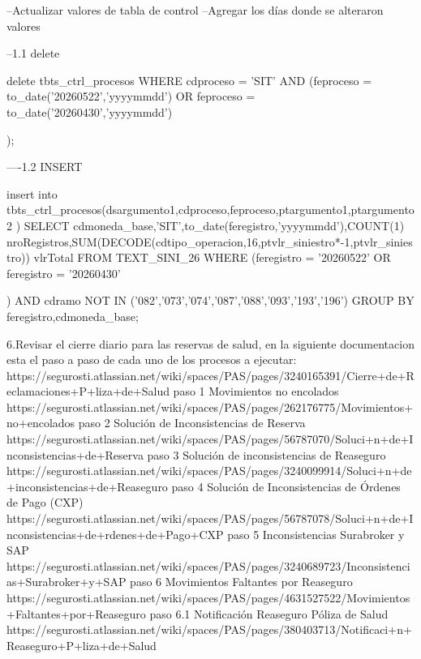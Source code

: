 --Actualizar valores de tabla de control
--Agregar los días donde se alteraron valores

--1.1 delete

delete tbts_ctrl_procesos
WHERE cdproceso = 'SIT'
AND (feproceso = to_date('20260522','yyyymmdd')
OR feproceso = to_date('20260430','yyyymmdd')

);


----1.2 INSERT

insert into tbts_ctrl_procesos(dsargumento1,cdproceso,feproceso,ptargumento1,ptargumento2 )
SELECT cdmoneda_base,'SIT',to_date(feregistro,'yyyymmdd'),COUNT(1) nroRegistros,SUM(DECODE(cdtipo_operacion,16,ptvlr_siniestro*-1,ptvlr_siniestro)) vlrTotal
FROM TEXT_SINI_26
WHERE (feregistro = '20260522'
OR feregistro = '20260430'

)
AND cdramo NOT IN ('082','073','074','087','088','093','193','196')
GROUP BY feregistro,cdmoneda_base;

6.Revisar el cierre diario para las reservas de salud, en la siguiente documentacion esta el paso a paso de cada uno de los procesos a ejecutar:
https://segurosti.atlassian.net/wiki/spaces/PAS/pages/3240165391/Cierre+de+Reclamaciones+P+liza+de+Salud
paso 1 Movimientos no encolados
https://segurosti.atlassian.net/wiki/spaces/PAS/pages/262176775/Movimientos+no+encolados
paso 2 Solución de Inconsistencias de Reserva
https://segurosti.atlassian.net/wiki/spaces/PAS/pages/56787070/Soluci+n+de+Inconsistencias+de+Reserva
paso 3 Solución de inconsistencias de Reaseguro
https://segurosti.atlassian.net/wiki/spaces/PAS/pages/3240099914/Soluci+n+de+inconsistencias+de+Reaseguro
paso 4 Solución de Inconsistencias de Órdenes de Pago (CXP)
https://segurosti.atlassian.net/wiki/spaces/PAS/pages/56787078/Soluci+n+de+Inconsistencias+de+rdenes+de+Pago+CXP
paso 5 Inconsistencias Surabroker y SAP
https://segurosti.atlassian.net/wiki/spaces/PAS/pages/3240689723/Inconsistencias+Surabroker+y+SAP
paso 6 Movimientos Faltantes por Reaseguro
https://segurosti.atlassian.net/wiki/spaces/PAS/pages/4631527522/Movimientos+Faltantes+por+Reaseguro
paso 6.1 Notificación Reaseguro Póliza de Salud
https://segurosti.atlassian.net/wiki/spaces/PAS/pages/380403713/Notificaci+n+Reaseguro+P+liza+de+Salud

